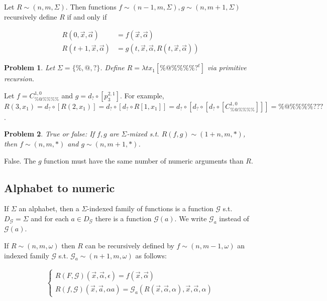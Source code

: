 \documentclass[a4paper, 12pt]{article}
\newtheorem{problem}{Problem}
\newtheorem{problem}{Problem}
\begin{document}
Let $R \sim (n, m, \Sigma)$. Then functions $f \sim (n - 1, m, \Sigma),  g \sim (n,
m + 1, \Sigma)$ recursively define $R$ if and only if 

\begin{align*}
    R(0, \overrightarrow{x}, \overrightarrow{\alpha}) &= f(\overrightarrow{x},
    \overrightarrow{\alpha}) \\ 
    R(t + 1, \overrightarrow{x}, \overrightarrow{\alpha}) &= g \left(t,
    \overrightarrow{x}, \overrightarrow{\alpha}, R(t, \overrightarrow{x},
\overrightarrow{\alpha})  \right) 
\end{align*}

\begin{problem}
    Let $\Sigma = \{\%, @, ?\}$. Define $R = \lambda t x_1 [\% @ \% \% \% \%
    ?^{t}]$ via primitive recursion.
\end{problem}

Let $f = C_{\% @ \% \% \% \%}^{1, 0}$ and $g = d_{?}  \circ \left[ p_{3}^{2, 1}
\right] $. For example, $R(3, x_1) = 
d_? \circ \left[ R(2, x_1)
\right] = d_? \circ  \left[ d_? \circ R[1, x_1] \right] = d_? \circ \left[ d_?
\circ \left[ d_? \circ \left[ C_{\% @ \% \% \% \%}^{1, 0}  \right]  \right]
\right] = \% @ \% \% \% \% ? ? ? $.

\begin{problem}
    True or false: If $f, g$ are $\Sigma$-mixed s.t. $R(f, g) \sim (1 + n, m,
    *)$, then $f \sim (n, m, *)$ and $g \sim (n, m+1, *)$.
\end{problem}

False. The $g$ function must have the same number of numeric arguments than $R$.

\pagebreak 

\subsection{Alphabet to numeric}

If $\Sigma$ an alphabet, then a $\Sigma$-indexed family of functions is a
function $\mathcal{G}$ s.t. $D_{\mathcal{G}} = \Sigma$ and for each $a \in
D_{\mathcal{G}}$ there is a function $\mathcal{G}(a)$. We write $\mathcal{G}_a$
instead of $\mathcal{G}(a)$.

If $R \sim (n, m, \omega)$ then $R$ can be recursively defined by $f \sim (n, m
- 1, \omega)$ an indexed
family $\mathcal{G}$ s.t. $\mathcal{G}_a \sim (n + 1, m, \omega)$ as follows: 

\begin{align*}
    \begin{cases}
        R(F, \mathcal{G})(\overrightarrow{x}, \overrightarrow{\alpha}, \epsilon)
        = f(\overrightarrow{x}, \overrightarrow{\alpha}) \\ 
        R(f, \mathcal{G})(\overrightarrow{x}, \overrightarrow{a}, \alpha a) =
        \mathcal{G}_a \left( R(\overrightarrow{x}, \overrightarrow{\alpha},
        \alpha), \overrightarrow{x}, \overrightarrow{\alpha}, \alpha \right) 
    \end{cases}
\end{align*}
\end{document}
